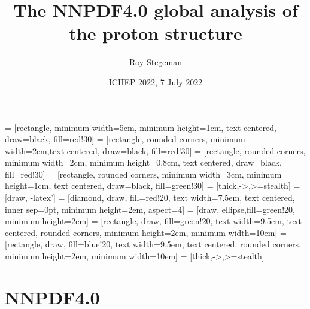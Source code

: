 \documentclass[aspectratio=169,9pt]{beamer}
\title{The NNPDF4.0 global analysis of the proton structure}
\date{ICHEP 2022, 7 July 2022}
\author{Roy Stegeman}
\institute{University of Milan and INFN Milan}
\begin{document}
{
\begin{frame}
  \titlepage
\end{frame}
}


\usetikzlibrary{shapes, arrows}
\usetikzlibrary{decorations.pathreplacing}
\usetikzlibrary{positioning, calc}
 = [rectangle, minimum width=5cm, minimum height=1cm, text centered, draw=black, fill=red!30]
 = [rectangle, rounded corners, minimum width=2cm,text centered, draw=black, fill=red!30]
 = [rectangle, rounded corners, minimum width=2cm, minimum height=0.8cm, text centered, draw=black, fill=red!30]
 = [rectangle, rounded corners, minimum width=3cm, minimum height=1cm, text centered, draw=black, fill=green!30]
 = [thick,->,>=stealth]
 =[draw, -latex']
 = [diamond, draw, fill=red!20, text width=7.5em, text centered,  inner sep=0pt, minimum height=2em, aspect=4]
 = [draw, ellipse,fill=green!20, minimum height=2em]
 = [rectangle, draw, fill=green!20, text width=9.5em, text centered, rounded corners, minimum height=2em, minimum width=10em]
=[rectangle, draw, fill=blue!20, text width=9.5em, 
                   text centered, rounded corners, minimum height=2em, 
                   minimum width=10em]
 = [thick,->,>=stealth]




\section*{NNPDF4.0}
\end{document}
